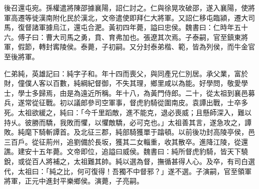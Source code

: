 \begin{pinyinscope}
後召還屯宛。孫權遣將陳邵據襄陽，詔仁討之。仁與徐晃攻破邵，遂入襄陽，使將軍高遷等徙漢南附化民於漢北，文帝遣使即拜仁大將軍。又詔仁移屯臨潁，遷大司馬，復督諸軍據烏江，還屯合淝。黃初四年薨，謚曰忠侯。魏書曰：仁時年五十六。傅子曰：曹大司馬之勇，賁、育弗加也。張遼其次焉。子泰嗣，官至鎮東將軍，假節，轉封寗陵侯。泰薨，子初嗣。又分封泰弟楷、範，皆為列侯，而牛金官至後將軍。

仁弟純，英雄記曰：純字子和。年十四而喪父，與同產兄仁別居。承父業，富於財，僮僕人客以百數，純綱紀督御，不失其理，鄉里咸以為能。好學問，敬愛學士，學士多歸焉，由是為遠近所稱。年十八，為黃門侍郎。二十，從太祖到襄邑募兵，遂常從征戰。初以議郎參司空軍事，督虎豹騎從圍南皮。袁譚出戰，士卒多死。太祖欲緩之，純曰：「今千里蹈敵，進不能克，退必喪威；且懸師深入，難以持乆。彼勝而驕，我敗而懼，以懼敵驕，必可克也。」太祖善其言，遂急攻之，譚敗。純麾下騎斬譚首。及北征三郡，純部騎獲單于蹹頓。以前後功封高陵亭侯，邑三百戶。從征荊州，追劉備於長坂，獲其二女輜重，收其散卒。進降江陵，從還譙。建安十五年薨。文帝即位，追謚曰威侯。魏書曰：純所督虎豹騎，皆天下驍銳，或從百人將補之，太祖難其帥。純以選為督，撫循甚得人心。及卒，有司白選代，太祖曰：「純之比，何可復得！吾獨不中督邪？」遂不選。子演嗣，官至領軍將軍，正元中進封平樂鄉侯。演薨，子亮嗣。


\end{pinyinscope}